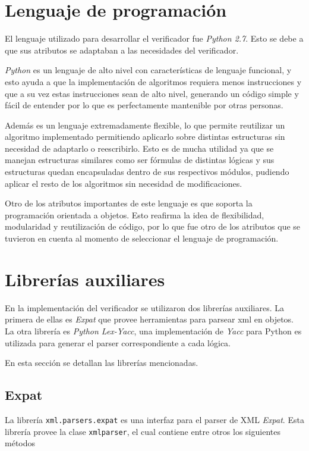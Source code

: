 \section{Lenguaje de programación}
El lenguaje utilizado para desarrollar el verificador fue \textit{Python 2.7}. Esto se debe a que sus
 atributos se adaptaban a las necesidades del verificador.

\textit{Python} es un lenguaje de alto nivel con características de lenguaje funcional,
 y esto ayuda a que la implementación de
 algoritmos requiera menos instrucciones y que a su vez estas instrucciones sean de alto
 nivel, generando un código simple y fácil de entender por lo que es perfectamente
 mantenible por otras personas.
 
Además es un lenguaje extremadamente flexible, lo que permite reutilizar un algoritmo
 implementado permitiendo aplicarlo sobre distintas estructuras sin necesidad de adaptarlo o
 reescribirlo. Esto es de mucha utilidad ya que se manejan estructuras similares como ser
 fórmulas de distintas lógicas y sus estructuras quedan encapsuladas dentro de sus respectivos
 módulos, pudiendo aplicar el resto de los algoritmos sin necesidad de modificaciones.

Otro de los atributos importantes de este lenguaje es que soporta la programación orientada
 a objetos. Esto reafirma la idea de flexibilidad, modularidad y reutilización de código,
 por lo que fue otro de los atributos que se tuvieron en cuenta al momento de seleccionar
 el lenguaje de programación.



\section{Librerías auxiliares}
En la implementación del verificador se utilizaron dos librerías auxiliares.
La primera de ellas es \textit{Expat} que provee herramientas para
 parsear xml en objetos. La otra librería es \textit{Python Lex-Yacc}, una implementación
 de \textit{Yacc} para Python es utilizada para generar el parser correspondiente a cada lógica.

En esta sección se detallan las librerías mencionadas.

\subsection{Expat}
La librería \texttt{xml.parsers.expat} es una interfaz para el parser de XML \textit{Expat}.
Esta librería provee la clase \texttt{xmlparser}, el cual contiene entre otros los siguientes
 métodos

